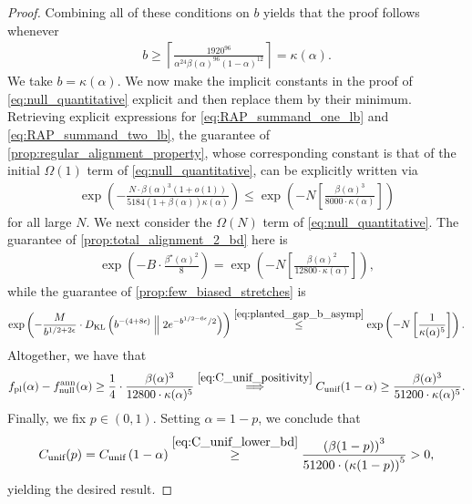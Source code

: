 \documentclass[11pt]{amsart}
\numberwithin{equation}{section}
\numberwithin{equation}{section}
\newcommand{\1}{\mathbbm{1}}
\newcommand{\KL}{D_{\mathrm{KL}}}
\newcommand{\unif}{\textup{unif}}
\newcommand{\doubleline}{\;\middle\|\;}
\newcommand{\fpl}{f_{\mathrm{pl}}}
\newcommand{\fnullann}{f_{\mathrm{null}}^{\mathrm{ann}}}
\theoremstyle{definition}
\begin{document}
\begin{appendices}
\begin{proof}
    Combining all of these conditions on $b$ yields that the proof follows whenever
    \begin{align*}
        b \geq \left\lceil \frac{1920^{96}}{\alpha^{24}\beta(\alpha)^{96} (1-\alpha)^{12}} \right\rceil = \kappa(\alpha).
    \end{align*}
    We take $b = \kappa(\alpha)$. We now make the implicit constants in the proof of \eqref{eq:null_quantitative} explicit and then replace them by their minimum. Retrieving explicit expressions for \eqref{eq:RAP_summand_one_lb} and \eqref{eq:RAP_summand_two_lb}, the guarantee of \cref{prop:regular_alignment_property}, whose corresponding constant is that of the initial $\Omega(1)$ term of \eqref{eq:null_quantitative}, can be explicitly written via
    \begin{align*}
        \exp\left( -\frac{N \cdot  \beta(\alpha)^3(1+o(1))}{5184(1+\beta(\alpha))\kappa(\alpha)} \right) \leq \exp\left( -N \left[ \frac{\beta(\alpha)^3}{8000 \cdot \kappa(\alpha)}\right] \right)
    \end{align*}
    for all large $N$. We next consider the $\Omega(N)$ term of \eqref{eq:null_quantitative}. The guarantee of \cref{prop:total_alignment_2_bd} here is
    \begin{align*}
        \exp\left( - B \cdot \frac{\beta^\star(\alpha)^2}{8} \right) = \exp\left( -N \left[ \frac{\beta(\alpha)^2}{12800 \cdot \kappa(\alpha)} \right] \right),
    \end{align*}
    while the guarantee of \cref{prop:few_biased_stretches} is 
    \begin{align*}
        \exp\left( -\frac{M}{b^{1/2+2\epsilon}} \cdot \KL\left( b^{-(4+8\epsilon)} \doubleline 2e^{-b^{1/2-6\epsilon}/2} \right) \right) \stackrel{\eqref{eq:planted_gap_b_asymp}}{\leq} \exp\left( -N \left[ \frac{1}{\kappa(\alpha)^5} \right] \right).
    \end{align*}
    Altogether, we have that
    \begin{align} \label{eq:C_unif_lower_bd}
        \fpl(\alpha) - \fnullann(\alpha) \geq \frac{1}{4} \cdot \frac{\beta(\alpha)^3}{12800 \cdot \kappa(\alpha)^5} \stackrel{\eqref{eq:C_unif_positivity}}{\implies} C_{\unif}(1-\alpha) \geq \frac{\beta(\alpha)^3}{51200 \cdot \kappa(\alpha)^5}.
    \end{align}
    Finally, we fix $p \in (0, 1)$. Setting $\alpha = 1-p$, we conclude that
    \begin{align*}
        C_\unif(p) = C_\unif\left( 1 - \alpha \right) \stackrel{\eqref{eq:C_unif_lower_bd}}{\geq} \frac{\left(\beta(1-p)\right)^3}{51200 \cdot \left(\kappa(1-p)\right)^5} > 0,
    \end{align*}
    yielding the desired result.
\end{proof}


\end{appendices}
\end{document}
